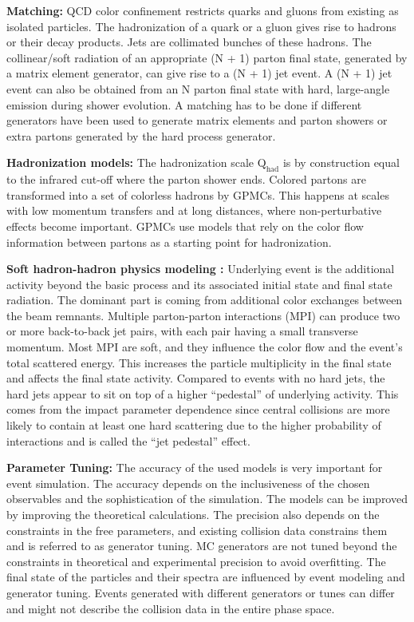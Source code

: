\textbf{Matching:} QCD color confinement restricts quarks and gluons from existing as isolated particles. The hadronization of a quark or a gluon gives rise to hadrons or their decay products. Jets are collimated bunches of these hadrons. The collinear/soft radiation of an appropriate (N + 1) parton final state, generated by a matrix element generator, can give rise to a (N + 1) jet event. A (N + 1) jet event can also be obtained from an N parton final state with hard, large-angle emission during shower evolution. A matching has to be done if different generators have been used to generate matrix elements and parton showers or extra partons generated by the hard process generator.

\textbf{Hadronization models:} The hadronization scale $\text{Q}_{\text{had}}$ is by construction equal to the infrared cut-off where the parton shower ends. Colored partons are transformed into a set of colorless hadrons by GPMCs. This happens at scales with low momentum transfers and at long distances, where non-perturbative effects become important. GPMCs use models that rely on the color flow information between partons as a starting point for hadronization.

\textbf{Soft hadron-hadron physics modeling :} Underlying event is the additional activity beyond the basic process and its associated initial state and final state radiation. The dominant part is coming from additional color exchanges between the beam remnants. Multiple parton-parton interactions (MPI) can produce two or more back-to-back jet pairs, with each pair having a small transverse momentum. Most MPI are soft, and they influence the color flow and the event's total scattered energy. This increases the particle multiplicity in the final state and affects the final state activity. Compared to events with no hard jets, the hard jets appear to sit on top of a higher ``pedestal'' of underlying activity. This comes from the impact parameter dependence since central collisions are more likely to contain at least one hard scattering due to the higher probability of interactions and is called the ``jet pedestal'' effect.

\textbf{Parameter Tuning:} The accuracy of the used models is very important for event simulation. The accuracy depends on the inclusiveness of the chosen observables and the sophistication of the simulation. The models can be improved by improving the theoretical calculations. The precision also depends on the constraints in the free parameters, and existing collision data constrains them and is referred to as generator tuning. MC generators are not tuned beyond the constraints in theoretical and experimental precision to avoid overfitting. The final state of the particles and their spectra are influenced by event modeling and generator tuning. Events generated with different generators or tunes can differ and might not describe the collision data in the entire phase space.


